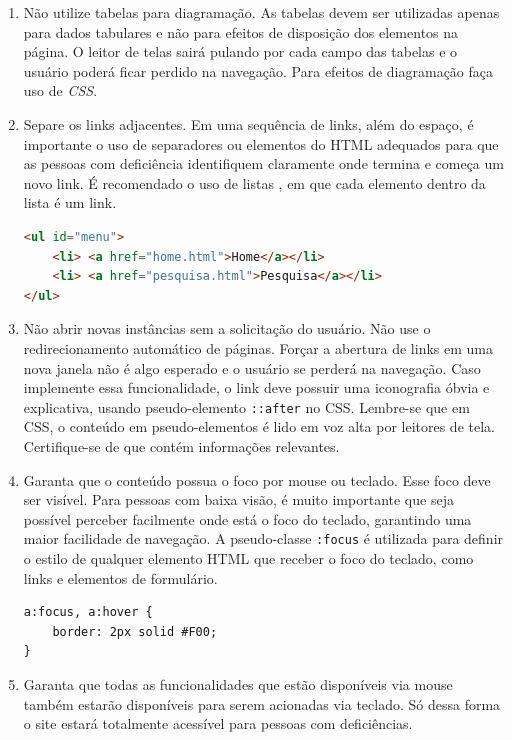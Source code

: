 {{{\begin{enumerate}
{\begin{lstlisting}[language=html,caption=usando landmarks]
<div role="heading" id="cabecalho"> 
  <h1>O Cabeçalho</h1> 
  <a href="#conteudo" accesskey="p">Pular para o conteúdo principals</a> 
</div> 
<div role="navigation" id="navegacao"> conteúdo da navegação </div>
<div role="main" id="conteudo"> conteúdo da main </mdiv>
\end{lstlisting}}
    \item Não utilize tabelas para diagramação. As tabelas devem ser utilizadas apenas para dados tabulares e não para efeitos de disposição dos elementos na página. O leitor de telas sairá pulando por cada campo das tabelas e o usuário poderá ficar perdido na navegação. Para efeitos de diagramação faça uso de \textit{CSS}.
    \item Separe os links adjacentes. Em uma sequência de links, além do espaço, é importante o uso de separadores ou elementos do HTML adequados para que as pessoas com deficiência identifiquem claramente onde termina e começa um novo link. É recomendado o uso de listas , em que cada elemento dentro da lista é um link.
{\begin{lstlisting}[language=html,caption=separando links adjacentes]
<ul id="menu">
    <li> <a href="home.html">Home</a></li>
    <li> <a href="pesquisa.html">Pesquisa</a></li>
</ul>
\end{lstlisting}}
    \item Não abrir novas instâncias sem a solicitação do usuário. Não use o redirecionamento automático de páginas. Forçar a abertura de links em uma nova janela não é algo esperado e o usuário se perderá na navegação. Caso implemente essa funcionalidade, o link deve possuir uma iconografia óbvia e explicativa, usando pseudo-elemento \lstinline{::after} no CSS. Lembre-se que em CSS, o conteúdo em pseudo-elementos é lido em voz alta por leitores de tela. Certifique-se de que contém informações relevantes.
    \item Garanta que o conteúdo possua o foco por mouse ou teclado. Esse foco deve ser visível. Para pessoas com baixa visão, é muito importante que seja possível perceber facilmente onde está o foco do teclado, garantindo uma maior facilidade de navegação. A pseudo-classe \lstinline{:focus} é utilizada para definir o estilo de qualquer elemento HTML que receber o foco do teclado, como links e elementos de formulário.
{\begin{lstlisting}[language=html,caption=usando o foco visível]
a:focus, a:hover {
    border: 2px solid #F00;
}
\end{lstlisting}}
    \item Garanta que todas as funcionalidades que estão disponíveis via mouse também estarão disponíveis para serem acionadas via teclado. Só dessa forma o site estará totalmente acessível para pessoas com deficiências. 
\end{enumerate}
}
}
}

